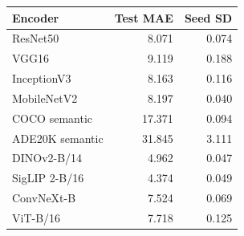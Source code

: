 \begin{tabular}{lrr}
\toprule
Encoder & Test MAE & Seed SD\\
\midrule
ResNet50 & 8.071 & 0.074\\
VGG16 & 9.119 & 0.188\\
InceptionV3 & 8.163 & 0.116\\
MobileNetV2 & 8.197 & 0.040\\
COCO semantic & 17.371 & 0.094\\
ADE20K semantic & 31.845 & 3.111\\
DINOv2-B/14 & 4.962 & 0.047\\
SigLIP 2-B/16 & 4.374 & 0.049\\
ConvNeXt-B & 7.524 & 0.069\\
ViT-B/16 & 7.718 & 0.125\\
\bottomrule
\end{tabular}
